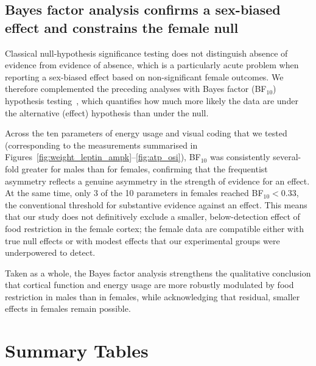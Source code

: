 \documentclass[11pt]{article}
\begin{document}
\subsection{Bayes factor analysis confirms a sex-biased effect and constrains the female null}

Classical null-hypothesis significance testing does not distinguish absence of evidence from evidence of absence, which is a particularly acute problem when reporting a sex-biased effect based on non-significant female outcomes. We therefore complemented the preceding analyses with Bayes factor (BF$_{10}$) hypothesis testing~\citep{sekulovski2024bayes}, which quantifies how much more likely the data are under the alternative (effect) hypothesis than under the null.

Across the ten parameters of energy usage and visual coding that we tested (corresponding to the measurements summarised in Figures~\ref{fig:weight_leptin_ampk}--\ref{fig:atp_osi}), BF$_{10}$ was consistently several-fold greater for males than for females, confirming that the frequentist asymmetry reflects a genuine asymmetry in the strength of evidence for an effect. At the same time, only 3 of the 10 parameters in females reached BF$_{10} < 0.33$, the conventional threshold for substantive evidence against an effect. This means that our study does not definitively exclude a smaller, below-detection effect of food restriction in the female cortex; the female data are compatible either with true null effects or with modest effects that our experimental groups were underpowered to detect.

Taken as a whole, the Bayes factor analysis strengthens the qualitative conclusion that cortical function and energy usage are more robustly modulated by food restriction in males than in females, while acknowledging that residual, smaller effects in females remain possible.

\section{Summary Tables}
\end{document}
